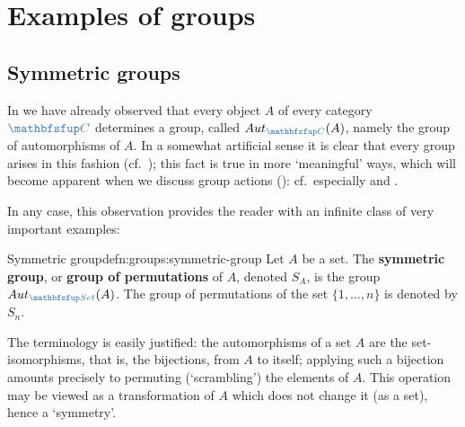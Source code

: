 \section{Examples of groups}
\label{sec:groups:examples-of-groups}


\subsection{Symmetric groups}
\label{subsec:groups:symmetric-groups}
In  we have already observed that
every object $A$ of every category $\categ{C}$ determines a group,
called $\Aut_{\categ{C}}(A)$, namely the group of automorphisms of
$A$. In a somewhat artificial sense it is clear that every group
arises in this fashion (cf.\
); this fact is true in more
`meaningful' ways, which will become apparent when we discuss group
actions (\Cref{sec:groups:group-actions}): cf.\ especially
 and
.

In any case, this observation provides the reader with an infinite
class of very important examples:
\begin{defn}{Symmetric group}{defn:groups:symmetric-group}
  Let $A$ be a set. The \textbf{symmetric group}, or \textbf{group of
    permutations} of $A$, denoted $S_A$, is the group
  $\Aut_{\categ{Set}}(A)$. The group of permutations of the set
  $\{1, \ldots, n\}$ is denoted by $S_n$.
\end{defn}
The terminology is easily justified: the automorphisms of a set $A$
are the set-isomorphisms, that is, the bijections, from $A$ to itself;
applying such a bijection amounts precisely to permuting
(`scrambling') the elements of $A$.  This operation may be viewed as a
transformation of $A$ which does not change it (as a set), hence a
`symmetry'.

